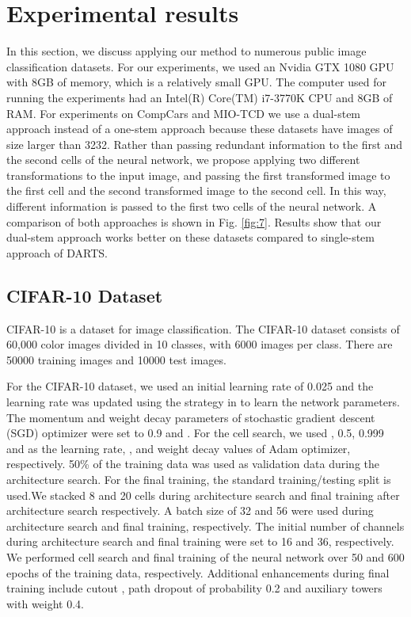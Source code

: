 \documentclass[10pt,a4paper,conference]{IEEEtran}
\begin{document}
\section{Experimental results}
In this section, we discuss applying our method to numerous public image classification datasets. For our experiments, we used an Nvidia GTX 1080 GPU with 8GB of memory, which is a relatively small GPU. The computer used for running the experiments had an Intel(R) Core(TM) i7-3770K CPU and 8GB of RAM. 
For experiments on CompCars and MIO-TCD we use a dual-stem approach instead of a one-stem approach because these datasets have images of size larger than 3232. Rather than passing redundant information to the first and the second cells of the neural network, we propose applying two different transformations to the input image, and passing the first transformed image to the first cell and the second transformed image to the second cell. In this way, different information is passed to the first two cells of the neural network. A comparison of both approaches is shown in Fig. \ref{fig:7}. Results show that our dual-stem approach works better on these datasets compared to single-stem approach of DARTS. \subsection{CIFAR-10 Dataset}
CIFAR-10 \cite{krizhevsky2009learning:21} is a dataset for image classification. The CIFAR-10 dataset consists of 60,000  color images divided in 10 classes, with 6000 images per class. There are 50000 training images and 10000 test images. 

For the CIFAR-10 dataset, we used an initial learning rate of 0.025 and the learning rate was updated using the strategy in \cite{Loshchilov2017SGDRSG:22} to learn the network parameters. The momentum and weight decay parameters of stochastic gradient descent (SGD) optimizer were set to 0.9 and . For the cell search, we used , 0.5, 0.999 and  as the learning rate, ,  and weight decay values of Adam optimizer, respectively. 50\% of the training data was used as validation data during the architecture search. For the final training, the standard training/testing split is used.We stacked 8 and 20 cells during architecture search and final training after architecture search respectively. A batch size of 32 and 56 were used during architecture search and final training, respectively. The initial number of channels during architecture search and final training were set to 16 and 36, respectively. We performed cell search and final training of the neural network over 50 and 600 epochs of the training data, respectively. Additional enhancements during final training include cutout \cite{devries2017improved:24}, path dropout of probability 0.2 and auxiliary towers with weight 0.4.
\end{document}
